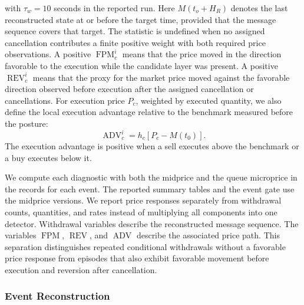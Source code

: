 \documentclass[11pt]{article}
\newenvironment{review}{\begingroup\color{blue}}{\endgroup}
\begin{document}
with $\tau_w=10$ seconds in the reported run. Here $M(t_o+H_R)$ denotes the last reconstructed state at or before the
target time, provided that the message sequence covers that target. The statistic is undefined when no assigned cancellation
contributes a finite positive weight with both required price observations.
A positive $\operatorname{FPM}^{i}_{c}$ means that the price moved in the direction favorable to the execution
while the candidate layer was present. A positive $\operatorname{REV}^{i}_{c}$ means that \begin{review}the proxy for the market price\end{review} moved
against \begin{review}the favorable direction observed before execution\end{review} after the assigned cancellation or cancellations. \begin{review}For execution price $P_c$, weighted by executed quantity\end{review}, we also define the local execution advantage relative to \begin{review}the benchmark measured before the posture\end{review}:
\begin{equation}
    \operatorname{ADV}^{i}_{c}
    =
    h_c\left[P_c-M(t_0)\right].
    \label{eq:execution_advantage}
\end{equation}
The execution advantage is positive when a sell executes above the benchmark or a buy executes below it.

We compute each diagnostic with both the midprice and the queue microprice in \begin{review}the records for each event\end{review}. The reported summary
tables and the event gate use the midprice versions. We report price responses separately from withdrawal counts,
quantities, and rates instead of multiplying all components into one detector. Withdrawal variables describe the
reconstructed message sequence. The variables $\operatorname{FPM}$, $\operatorname{REV}$, and $\operatorname{ADV}$
describe the associated price path. This separation distinguishes repeated conditional withdrawals without a favorable
price response from episodes that also exhibit \begin{review}favorable movement before execution and reversion after cancellation\end{review}.

\subsubsection{Event Reconstruction}
\label{subsec:event_reconstruction}
\end{document}
